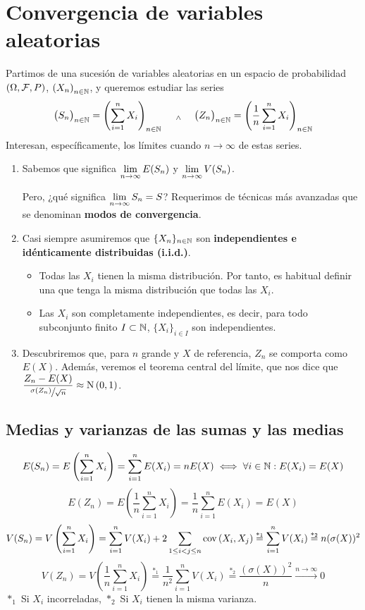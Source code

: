 
\section{Convergencia de variables aleatorias}

Partimos de una sucesión de variables aleatorias en un espacio de probabilidad $(\Omega, \mathcal{F}, P)$, $\displaystyle \left(X_n\right)_{n \in \mathbb{N}}$, y queremos estudiar las series
\[\big(S_n\big)_{n\in \mathbb{N}} = \left(\sum_{i=1}^{n} X_i\right)_{n \in \mathbb{N}} \quad \; _{\wedge} \; \quad \big(Z_n\big)_{n\in \mathbb{N}} = \left(\frac{1}{n}\sum_{i=1}^{n} X_i\right)_{n \in \mathbb{N}}\]
Interesan, específicamente, los límites cuando $n\to \infty$ de estas series.
\begin{enumerate}
	\item Sabemos que significa $\displaystyle \lim_{n\to\infty} E(S_n)$ y $\displaystyle \lim_{n\to\infty} V(S_n)$.

	      Pero, ¿qué significa $\displaystyle \lim_{n\to\infty} S_n = S$? Requerimos de técnicas más avanzadas que se denominan \textbf{modos de convergencia}.
	\item Casi siempre asumiremos que $\{X_n\}_{n\in \mathbb{N}}$ son \textbf{independientes e idénticamente distribuidas (i.i.d.)}.
	      \begin{itemize}
		      \item Todas las $X_i$ tienen la misma distribución. Por tanto, es habitual definir una  que tenga la misma distribución que todas las $X_i$.
		      \item Las $X_i$ son completamente independientes, es decir, para todo subconjunto finito $I \subset \mathbb{N}$, $\{X_i\}_{i\in I}$ son independientes.
	      \end{itemize}
	\item Descubriremos que, para $n$ grande y $X$ de referencia, $Z_n$ se comporta como $E(X)$. Además, veremos el teorema central del límite, que nos dice que $\displaystyle \frac{Z_n-E(X)}{\sfrac{\sigma(Z_n)}{\sqrt{n}}} \approx \operatorname{N}\left(0,1\right)$.
\end{enumerate}
\subsection{Medias y varianzas de las sumas y las medias}
\[E(S_n) = E\left(\sum_{i=1}^{n} X_i\right) = \sum_{i=1}^{n} E(X_i) = nE(X) \iff \forall i \in \mathbb{N} : E(X_i) = E(X)\]
\[E(Z_n) = E\left(\frac{1}{n}\sum_{i=1}^{n} X_i\right) = \frac{1}{n}\sum_{i=1}^{n} E(X_i) = E(X)\]
\[V(S_n) = V\left(\sum_{i=1}^{n} X_i\right) = \sum_{i=1}^{n} V(X_i) + 2 \sum_{1\leq i < j \leq n} \operatorname{cov}\left(X_i,X_j\right) \stackrel{*_1}{=} \sum_{i=1}^{n} V(X_i) \stackrel{*_2}{=} n(\sigma(X))^2\] %
\[V(Z_n) = V\left(\frac{1}{n}\sum_{i=1}^{n} X_i\right) \stackrel{*_1}{=} \frac{1}{n^2}\sum_{i=1}^{n} V(X_i) \stackrel{*_2}{=} \frac{(\sigma(X))^2}{n} \xrightarrow{n\to\infty} 0\]
\hspace*{\fill} $*_1$ Si $X_i$ incorreladas, $*_2$ Si $X_i$ tienen la misma varianza.

